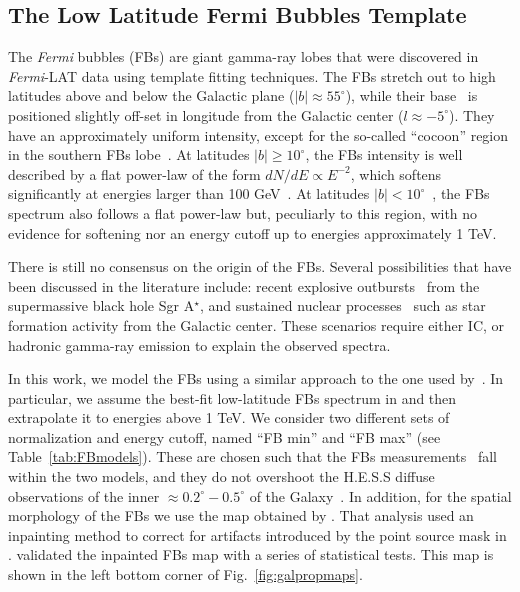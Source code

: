 \documentclass[doublespace,nopageskip]{VTthesis} %
\begin{document}
\subsection{The Low Latitude Fermi Bubbles Template}
\label{subsec:FBs}

The \textit{Fermi} bubbles (FBs) are giant gamma-ray lobes that were discovered in \textit{Fermi}-LAT data \citep{2010ApJ...724.1044S} using template fitting techniques. The FBs stretch out to high latitudes above and below the Galactic plane ($\lvert b \rvert \approx 55^\circ$), while their base~\citep{2019A&A...625A.110H} is positioned slightly off-set in longitude from the Galactic center ($l\approx-5^\circ$). 
They have an approximately uniform intensity, except for the so-called ``cocoon'' region in the southern FBs lobe~\citep{2012ApJ...753...61S, 2014ApJ...793...64A}. At latitudes $\lvert b
\rvert \geq 10^\circ$, the FBs intensity is well described by a flat power-law of the form $dN/dE\propto E^{-2}$, which  softens significantly at energies larger than 100 GeV~\citep{2014ApJ...793...64A}. At latitudes $\lvert b \rvert < 10^\circ$~\citep{2016ApJS..223...26A,2017ApJ...840...43A,2017JCAP...08..022S,2019A&A...625A.110H}, the FBs spectrum also follows a flat power-law but, peculiarly to this region, with no evidence for softening nor an energy cutoff up to energies approximately 1 TeV. 

There is still no consensus on the origin of the FBs. Several possibilities that have been discussed in the literature include: recent explosive outbursts~\citep{2010ApJ...724.1044S} from the supermassive black hole Sgr A$^\star$, and sustained nuclear processes~\citep{2015ApJ...808..107C} such as star formation activity from the Galactic center. These scenarios require either IC, or hadronic gamma-ray emission to explain the observed spectra.

In this work, we model the FBs using a similar approach to the one used by~\cite{2021PhRvD.103b3011R}. In particular, we assume the best-fit low-latitude FBs spectrum in \cite{2017ApJ...840...43A} and then extrapolate it to energies above 1 TeV. We consider two different sets of normalization and energy cutoff, named ``FB min'' and ``FB max'' (see Table~\ref{tab:FBmodels}). These are chosen such that the FBs measurements~\citep{2017ApJ...840...43A} fall within the two models, and they do not overshoot the H.E.S.S diffuse observations of the inner $\approx 0.2^\circ - 0.5^\circ$ of the Galaxy~\citep{2016Natur.531..476H}. In addition, for the spatial morphology of the FBs we use the map obtained by \citet{2019JCAP...09..042M}. That analysis used an inpainting method to correct for artifacts introduced by the point source mask in \cite{2017ApJ...840...43A}. \cite{2019JCAP...09..042M} validated the inpainted FBs map with a series of statistical tests. This map is shown in the left bottom corner of Fig.~\ref{fig:galpropmaps}.
\end{document}
